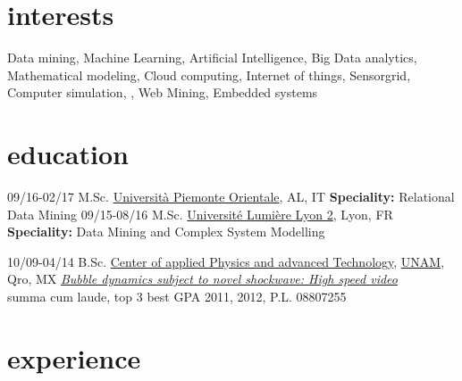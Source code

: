 \documentclass[]{friggeri-cv}
\begin{document}
\section{interests}

Data mining, Machine Learning, Artificial Intelligence, Big Data analytics, Mathematical modeling, Cloud computing, Internet of things, Sensorgrid,  Computer simulation,  , Web Mining, Embedded systems

\section{education}

\begin{entrylist}
\entry
{09/16-02/17}
{M.Sc. \href{http://www.em-dmkm.eu/}
	{}}
{\href{http://www.uniupo.it/}{Università Piemonte Orientale}, AL, IT}
{\textbf{Speciality:} Relational Data Mining
}
\entry
{09/15-08/16}
{M.Sc. \href{http://www.em-dmkm.eu/}
             {}}
     {\href{http://www.univ-lyon2.fr/}{Université Lumière Lyon 2}, Lyon, FR}
    {\textbf{Speciality:} Data Mining and Complex System Modelling}
    
\entry
{10/09-04/14}
{B.Sc. \href{http://www.fata.unam.mx/tecnologia}
             {}}
  {\href{http://www.fata.unam.mx/}{Center of applied Physics and advanced Technology}, \href{http://www.unam.mx/}{UNAM}, Qro, MX}           
{\href{https://dl.dropboxusercontent.com/u/2115508/Tesis.pdf}{\emph{Bubble dynamics subject to novel shockwave: High speed video}}\\
summa cum laude, top 3 best GPA 2011, 2012, P.L. 08807255
}
\end{entrylist}


\section{experience}
\end{document}
